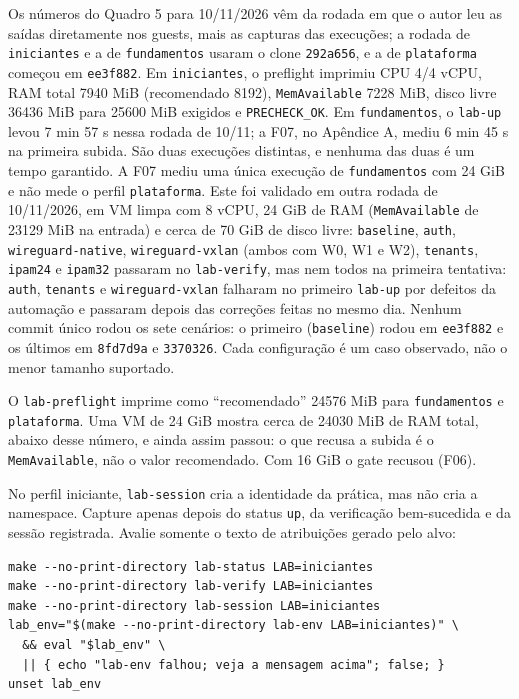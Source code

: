 \documentclass[12pt,openany,oneside,a4paper,chapter=TITLE,english,brazil]{abntex2}
\begin{document}
Os números do Quadro 5 para 10/11/2026 vêm da rodada em que o autor
leu as saídas diretamente nos guests, mais as capturas das execuções; a
rodada de \texttt{iniciantes} e a de \texttt{fundamentos} usaram o clone \texttt{292a656}, e a de
\texttt{plataforma} começou em \texttt{ee3f882}. Em \texttt{iniciantes}, o preflight imprimiu CPU
4/4 vCPU, RAM total 7940 MiB (recomendado 8192), \texttt{Mem\allowbreak{}Available} 7228 MiB, disco
livre 36436 MiB para 25600 MiB exigidos e \texttt{PRECHECK\_\allowbreak{}OK}. Em \texttt{fundamentos}, o
\texttt{lab-{}\allowbreak{}up} levou 7 min 57 s nessa rodada de 10/11; a F07, no Apêndice A, mediu
6 min 45 s na primeira subida. São duas execuções distintas, e nenhuma das duas
é um tempo garantido. A F07 mediu uma única execução de \texttt{fundamentos} com
24 GiB e não mede o perfil \texttt{plataforma}. Este foi validado em outra rodada de
10/11/2026, em VM limpa com
8 vCPU, 24 GiB de RAM (\texttt{Mem\allowbreak{}Available} de 23129 MiB na entrada) e cerca de
70 GiB de disco livre: \texttt{baseline}, \texttt{auth}, \texttt{wireguard-{}\allowbreak{}native},
\texttt{wireguard-{}\allowbreak{}vxlan} (ambos com W0, W1 e W2), \texttt{tenants}, \texttt{ipam24} e \texttt{ipam32}
passaram no \texttt{lab-{}\allowbreak{}verify}, mas nem todos na primeira tentativa: \texttt{auth}, \texttt{tenants}
e \texttt{wireguard-{}\allowbreak{}vxlan} falharam no primeiro \texttt{lab-{}\allowbreak{}up} por defeitos da automação e
passaram depois das correções feitas no mesmo dia. Nenhum commit único rodou os
sete cenários: o primeiro (\texttt{baseline}) rodou em \texttt{ee3f882} e os últimos em
\texttt{8fd7d9a} e \texttt{3370326}. Cada configuração é um caso observado, não o menor
tamanho suportado.

O \texttt{lab-{}\allowbreak{}preflight} imprime como ``recomendado'' 24576 MiB para \texttt{fundamentos} e
\texttt{plataforma}. Uma VM de 24 GiB mostra cerca de 24030 MiB de RAM total, abaixo
desse número, e ainda assim passou: o que recusa a subida é o \texttt{Mem\allowbreak{}Available}, não
o valor recomendado. Com 16 GiB o gate recusou (F06).

No perfil iniciante, \texttt{lab-{}\allowbreak{}session} cria a identidade da prática, mas não cria a
namespace. Capture apenas depois do status \texttt{up}, da verificação bem-sucedida e
da sessão registrada. Avalie somente o texto de atribuições gerado pelo alvo:

\begin{verbatim}
make --no-print-directory lab-status LAB=iniciantes
make --no-print-directory lab-verify LAB=iniciantes
make --no-print-directory lab-session LAB=iniciantes
lab_env="$(make --no-print-directory lab-env LAB=iniciantes)" \
  && eval "$lab_env" \
  || { echo "lab-env falhou; veja a mensagem acima"; false; }
unset lab_env
\end{verbatim}
\end{document}
